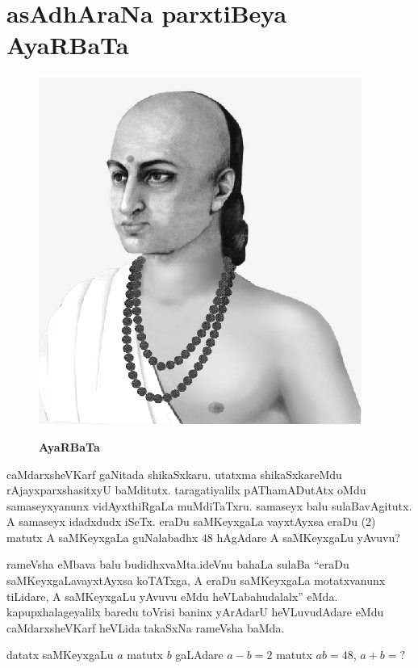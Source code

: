 \chapter{asAdhAraNa parxtiBeya AyaRBaTa}


\begin{figure}
  \centering\includegraphics[scale=0.8]{src/figures/aryabhata.eps}
  
  {\bf AyaRBaTa}
    \end{figure}
    
caMdarxsheVKarf gaNitada shikaSxkaru. utatxma shikaSxkareMdu rAjayxparxshasitxyU baMditutx. taragati\-yalilx pAThamADutAtx oMdu samaseyxyanunx vidAyxthiRgaLa muMdiTaTxru. samaseyx balu sulaBavAgitutx. A samaseyx idadxdudx iSeTx. eraDu saMKeyxgaLa vayxtAyxsa eraDu ($2$) matutx A saMKeyxgaLa guNalabadhx $48$ hAgAdare A saMKeyxgaLu yAvuvu?

rameVsha eMbava balu budidhxvaMta.\break ideVnu bahaLa sulaBa ``eraDu saMKeyxgaLa\break vayxtAyxsa koTATxga, A eraDu saMKeyxgaLa motatx\-vanunx tiLidare, A saMKeyxgaLu yAvuvu eMdu heVLabahudalalx'' eMda. kapupx\-halageyalilx baredu toVrisi baninx yArAdarU heVLuvudAdare eMdu caMdarx\-sheVKarf heVLida takaSxNa rameVsha baMda.

datatx saMKeyxgaLu $a$ matutx $b$ gaLAdare $a-b=2$ matutx $ab = 48$, $a+b=?$

